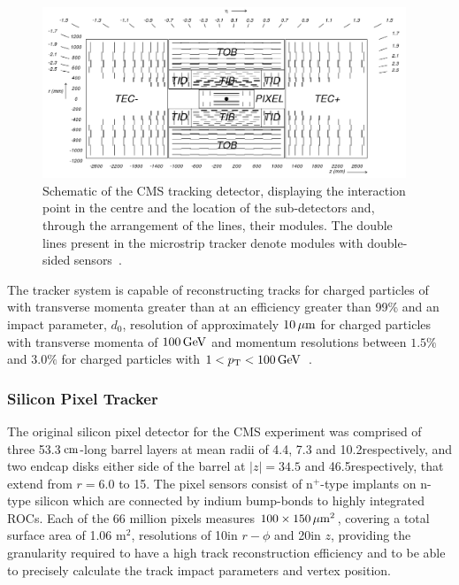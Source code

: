 \begin{figure}[htbp]
\begin{center}
\includegraphics[width=0.97\textwidth]{figs/cms/fig_cmstracker.png}
\caption{Schematic of the CMS tracking detector, displaying the interaction point in the centre and the location of the sub-detectors and, through the arrangement of the lines, their modules. The double lines present in the microstrip tracker denote modules with double-sided sensors~\cite{Sprenger:2010ss}.}
\label{fig:tracker}
\end{center}
\end{figure}

The tracker system is capable of reconstructing tracks for charged particles of with transverse momenta greater than at an efficiency greater than 99\% and an impact parameter, $d_{0}$, resolution of approximately $10\,\mu\text{m}$ for charged particles with transverse momenta of $100\,\text{Ge\hspace{-.08em}V}$ and momentum resolutions between $1.5\%$ and $3.0\%$ for charged particles with $1 < p_{\mathrm{T}} < 100\,\text{Ge\hspace{-.08em}V}$~\cite{Khachatryan:2010pw,Chatrchyan:2014fea}.

\subsubsection{Silicon Pixel Tracker}
The original silicon pixel detector for the CMS experiment was comprised of three 53.3$\,\text{cm}$-long barrel layers at mean radii of 4.4, 7.3 and 10.2\cm respectively, and two endcap disks either side of the barrel at $|z| = 34.5$ and 46.5\cm respectively, that extend from $r = 6.0$ to 15\cm.
The pixel sensors consist of n$^{+}$-type implants on n-type silicon which are connected by indium bump-bonds to highly integrated ROCs.
Each of the 66 million pixels measures $100 \times 150\,\mu\text{m}^{2}$, covering a total surface area of 1.06 m$^{2}$, resolutions of 10\mum in $r-\phi$ and 20\mum in $z$, providing the granularity required to have a high track reconstruction efficiency and to be able to precisely calculate the track impact parameters and vertex position.

